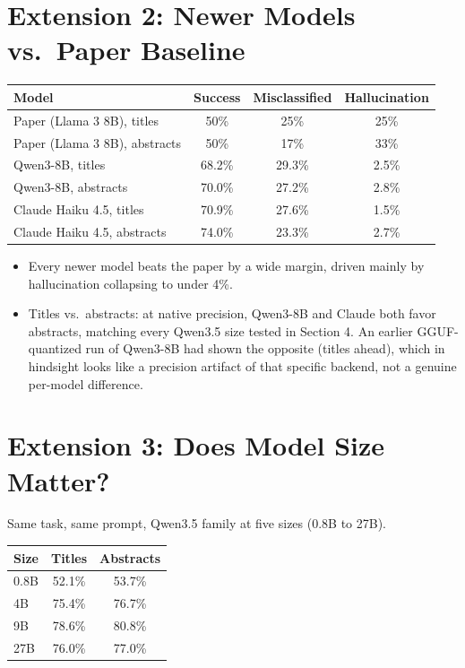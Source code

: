 \documentclass[12pt]{article}
\begin{document}
\FloatBarrier
\section{Extension 2: Newer Models vs.\ Paper Baseline}

\begin{table}[h]
\centering
\begin{tabular}{lccc}
\toprule
Model & Success & Misclassified & Hallucination \\
\midrule
Paper (Llama 3 8B), titles & 50\% & 25\% & 25\% \\
Paper (Llama 3 8B), abstracts & 50\% & 17\% & 33\% \\
Qwen3-8B, titles & 68.2\% & 29.3\% & 2.5\% \\
Qwen3-8B, abstracts & 70.0\% & 27.2\% & 2.8\% \\
Claude Haiku 4.5, titles & 70.9\% & 27.6\% & 1.5\% \\
Claude Haiku 4.5, abstracts & 74.0\% & 23.3\% & 2.7\% \\
\bottomrule
\end{tabular}
\end{table}

\begin{itemize}
    \item Every newer model beats the paper by a wide margin, driven mainly by hallucination collapsing to under 4\%.
    \item Titles vs.\ abstracts: at native precision, Qwen3-8B and Claude both favor abstracts, matching every Qwen3.5 size tested in Section 4. An earlier GGUF-quantized run of Qwen3-8B had shown the opposite (titles ahead), which in hindsight looks like a precision artifact of that specific backend, not a genuine per-model difference.
\end{itemize}

\FloatBarrier
\section{Extension 3: Does Model Size Matter?}

Same task, same prompt, Qwen3.5 family at five sizes (0.8B to 27B).

\begin{table}[h]
\centering
\begin{tabular}{lcc}
\toprule
Size & Titles & Abstracts \\
\midrule
0.8B & 52.1\% & 53.7\% \\
4B & 75.4\% & 76.7\% \\
9B & 78.6\% & 80.8\% \\
27B & 76.0\% & 77.0\% \\
\bottomrule
\end{tabular}
\end{table}
\end{document}

